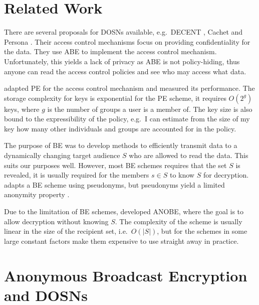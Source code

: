 \section{Related Work}\label{sec:RelatedWork}

There are several proposals for \acp{DOSN} available, e.g.~DECENT
\cite{decent}, Cachet \cite{cachet} and Persona \cite{persona}.
Their access control mechanisms focus on providing confidentiality for the 
data.
They use \ac{ABE} \cite{abe} to implement the access control mechanism.
Unfortunately, this yields a lack of privacy as \ac{ABE} is not policy-hiding, 
thus anyone can read the access control policies and see who may access what 
data.

\citet{predicateac} adapted \ac{PE} for the access control mechanism and 
measured its performance.
The storage complexity for keys is exponential for the \ac{PE} scheme, it 
requires \(O(2^g)\) keys, where \(g\) is the number of groups a user is 
a member of.
The key size is also bound to the expressibility of the policy, e.g.~I can 
estimate from the size of my key how many other individuals and groups are 
accounted for in the policy.

The purpose of \ac{BE} \cite{broadcastenc} was to develop methods to 
efficiently transmit data to a dynamically changing target audience \(S\) who 
are allowed to read the data.
This suits our purposes well.
However, most \ac{BE} schemes requires that the set \(S\) is revealed, it is 
usually required for the members \(s\in S\) to know \(S\) for decryption.
\citet{gunther2012cryptographic} adapts a \ac{BE} scheme using pseudonyms, but 
pseudonyms yield a limited anonymity property \cite{gunther2012cryptographic}.

Due to the limitation of \ac{BE} schemes, \citet{anobe} developed \ac{ANOBE}, 
where the goal is to allow decryption without knowing \(S\).
The complexity of the scheme is usually linear in the size of the recipient 
set, i.e.~\(O(|S|)\), but for the schemes in \cite{anobe} some large constant 
factors make them expensive to use straight away in practice.


\section{Anonymous Broadcast Encryption and \acsp{DOSN}}\label{sec:ANOBE}

